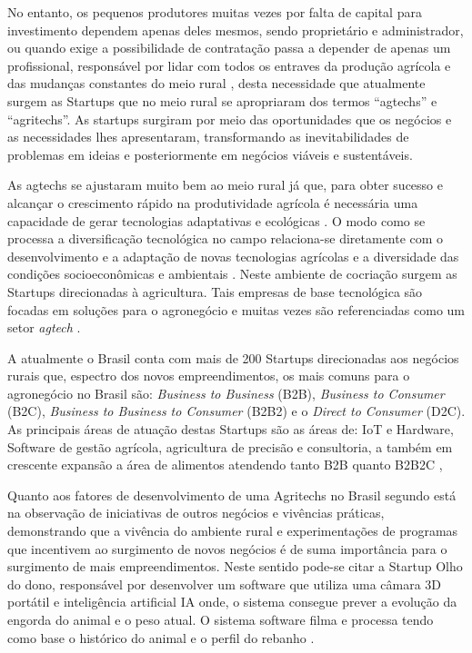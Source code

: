 No entanto, os pequenos produtores muitas vezes por falta de capital para investimento dependem apenas deles mesmos, sendo proprietário e administrador, ou quando exige a possibilidade de contratação passa a depender de apenas um profissional, responsável por lidar com todos os entraves da produção agrícola e das mudanças constantes do meio rural \cite{soares_relacao_2017}, desta necessidade que atualmente surgem as Startups que no meio rural se apropriaram dos termos “agtechs” e “agritechs”. As startups surgiram por meio das oportunidades que os negócios e as necessidades lhes apresentaram, transformando as inevitabilidades de problemas em ideias e posteriormente em negócios viáveis e sustentáveis. 

As agtechs se ajustaram muito bem ao meio rural já que, para obter sucesso e alcançar o crescimento rápido na produtividade agrícola é necessária uma capacidade de gerar tecnologias adaptativas e ecológicas \cite{contini_hayami_2019}. O modo como se processa a diversificação tecnológica no campo relaciona-se diretamente com o desenvolvimento e a adaptação de novas tecnologias agrícolas e a diversidade das condições socioeconômicas e ambientais \cite{fen-azmeyer_o_2019}. Neste ambiente de cocriação surgem as Startups direcionadas à agricultura. Tais empresas de base tecnológica são focadas em soluções para o agronegócio e muitas vezes são referenciadas como um setor \textit{agtech} \cite{blanco_agtechs_2020}.


A atualmente o Brasil conta com mais de 200 Startups direcionadas aos negócios rurais que, espectro dos novos empreendimentos, os mais comuns para o agronegócio no Brasil são: \textit{Business to Business} (B2B), \textit{Business to Consumer} (B2C), \textit{Business to Business to Consumer} (B2B2) e o \textit{Direct to Consumer} (D2C). As principais áreas de atuação destas Startups são as áreas de: IoT e Hardware, Software de gestão agrícola, agricultura de precisão e consultoria, a também em crescente expansão a área de alimentos atendendo tanto B2B quanto B2B2C \cite{abstartups_startupbase_2019}, 

Quanto aos fatores de desenvolvimento de uma Agritechs no Brasil segundo \cite{mondin_2_2018} está na observação de iniciativas de outros negócios e vivências práticas, demonstrando que a vivência do ambiente rural e experimentações de programas que incentivem ao surgimento de novos negócios é de suma importância para o surgimento de mais empreendimentos. Neste sentido pode-se citar a Startup Olho do dono, responsável por desenvolver um software que utiliza uma câmara 3D portátil e inteligência artificial IA onde, o sistema consegue prever a evolução da engorda do animal e o peso atual. O sistema software filma e processa tendo como base o histórico do animal e o perfil do rebanho \cite{coutinho_olho_2019}.




